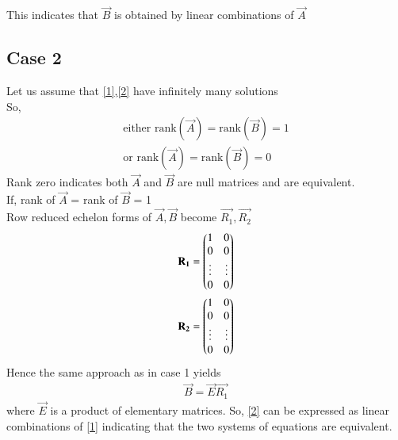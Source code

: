 \documentclass[journal,12pt,twocolumn]{IEEEtran}
\begin{document}
This indicates that $\vec{B}$ is obtained by linear combinations of $\vec{A}$ 

\subsection{Case 2}
Let us assume that \eqref{1},\eqref{2} have infinitely many solutions\\
So,
\begin{align}
\text{either rank}(\vec{A}) = \text{rank}(\vec{B}) = 1 \\
\text{or rank}(\vec{A})= \text{rank}(\vec{B}) = 0
\end{align}
Rank zero indicates both $\vec{A}$ and $\vec{B}$ are null matrices and are equivalent.\\
If, rank of $\vec{A}$ = rank of $\vec{B}$ = 1\\
Row reduced echelon forms of $\vec{A},\vec{B}$ become $\vec{R_1},\vec{R_2}$ 
\begin{align}
    \mathbf{R_1}=\begin{pmatrix}1&0\\0&0\\\vdots&\vdots\\0&0\end{pmatrix}\\
    \mathbf{R_2}=\begin{pmatrix}1&0\\0&0\\\vdots&\vdots\\0&0\end{pmatrix}
\end{align}
Hence the same approach as in case 1 yields
\begin{align}
    \vec{B}=\vec{E}\vec{R_1}
\end{align}
 where $\vec{E}$ is a product of elementary matrices.
So, \eqref{2} can be expressed as linear combinations of \eqref{1} indicating that the two systems of equations are equivalent.
\end{document}
